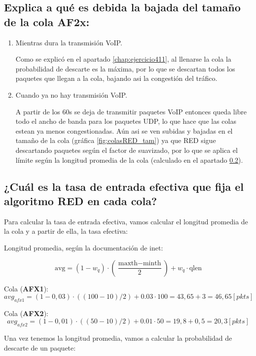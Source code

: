 \subsection{Explica a qué es debida la bajada del tamaño de la cola AF2x:}
\begin{enumerate}
    \item Mientras dura la transmisión VoIP.
    
    Como se explicó en el apartado \ref{chap:ejercicio411}, al llenarse la cola la probabilidad de descarte es la máxima, por lo que se descartan
    todos los paquetes que llegan a la cola, bajando asi la congestión del tráfico.      

    \item Cuando ya no hay transmisión VoIP.
    
    A partir de los 60s se deja de transmitir paquetes VoIP entonces queda libre todo el ancho de banda para los paquetes UDP, 
    lo que hace que las colas estean ya menos congestionadas. Aún asi se ven subidas y bajadas en el tamaño de la cola (gráfica \ref{fig:colasRED_tam}) 
    ya que RED sigue descartando paquetes según el factor de suavizado, por lo que se aplica el límite según la longitud promedia de la cola (calculado en 
    el apartado \ref{text:calculos}).
    


\end{enumerate}

\subsection{¿Cuál es la tasa de entrada efectiva que fija el algoritmo RED en cada cola?} \label{text:calculos}

Para calcular la tasa de entrada efectiva, vamos calcular el longitud promedia de la cola y a partir de ella, la tasa efectiva:

Longitud promedia, según la documentación de inet:

\[
\text{avg} = (1 - w_q) \cdot \left(\frac{\text{maxth} - \text{minth}}{2}\right) + w_q \cdot \text{qlen}
\]

Cola (\textbf{AFX1}):
\[
 avg_{afx1} = (1-0,03) \cdot \left((100-10)/2\right) + 0.03 \cdot 100 = 43,65 + 3 = 46,65 [pkts]
\]

Cola (\textbf{AFX2}):
\[
 avg_{afx2} = (1-0,01) \cdot \left((50-10)/2\right) + 0.01 \cdot 50 = 19,8 + 0,5 = 20,3 [pkts]
\]

Una vez tenemos la longitud promedia, vamos a calcular la probabilidad de descarte de un paquete:

